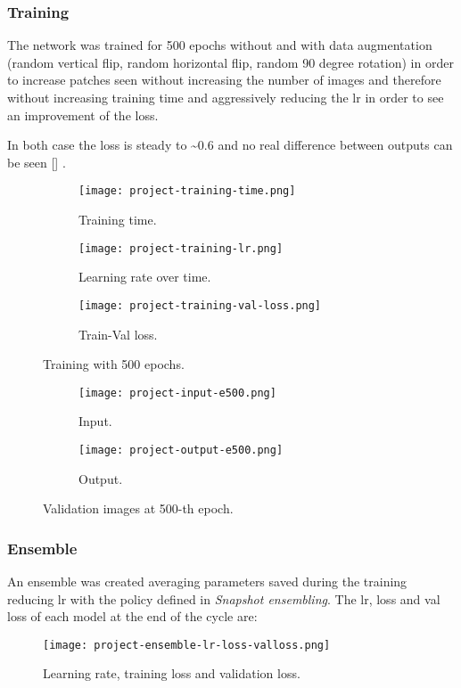 \subsubsection{Training}

The network was trained for 500 epochs without and with data augmentation (random vertical flip, random horizontal flip, random 90 degree rotation) in order to increase patches seen without increasing the number of images and therefore without increasing training time and  aggressively reducing the lr in order to see an improvement of the loss.

In both case the loss is steady to \textasciitilde 0.6 and no real difference between outputs can be seen [] .

\begin{figure}[H]
    \begin{subfigure}{\textwidth}
        \centering
        \texttt{[image: project-training-time.png]}
        \caption{Training time.}
    \end{subfigure}
    \begin{subfigure}{\textwidth}
        \centering
        \texttt{[image: project-training-lr.png]}
        \caption{Learning rate over time.}
    \end{subfigure}
    \begin{subfigure}{\textwidth}
        \centering
        \texttt{[image: project-training-val-loss.png]}
        \caption{Train-Val loss.}
    \end{subfigure}
    \caption{Training with 500 epochs.}
\end{figure}

\begin{figure}[H]
    \begin{subfigure}{\textwidth}
        \centering
        \texttt{[image: project-input-e500.png]}
        \caption{Input.}
    \end{subfigure}
    \begin{subfigure}{\textwidth}
        \centering
        \texttt{[image: project-output-e500.png]}
        \caption{Output.}
    \end{subfigure}
    \caption{Validation images at 500-th epoch.}\label{project:training}
\end{figure}

\subsubsection{Ensemble}
An ensemble was created averaging parameters saved during the training reducing lr with the policy defined in \textit{Snapshot ensembling}\cite{snapshotesembling}.
The lr, loss and val loss of each model at the end of the cycle are:
\begin{figure}[H]
    \centering
    \texttt{[image: project-ensemble-lr-loss-valloss.png]}
    \caption{Learning rate, training loss and validation loss.}
\end{figure}

